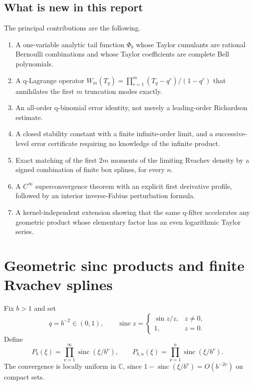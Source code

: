 \documentclass[11pt]{article}
\theoremstyle{definition}
\theoremstyle{remark}
\newcommand{\sinc}{\operatorname{sinc}}
\newcommand{\C}{\mathbb{C}}
\begin{document}
\subsection{What is new in this report}

The principal contributions are the following.

\begin{enumerate}[label=\textbf{N\arabic*.},leftmargin=12mm]
\item A one-variable analytic tail function \(\Phi_b\) whose Taylor cumulants
are rational Bernoulli combinations and whose Taylor coefficients are complete
Bell polynomials.

\item A q-Lagrange operator
\(W_m(T_q)=\prod_{r=1}^m(T_q-q^r)/(1-q^r)\) that annihilates the first \(m\)
truncation modes exactly.

\item An all-order q-binomial error identity, not merely a leading-order
Richardson estimate.

\item A closed stability constant with a finite infinite-order limit, and a
successive-level error certificate requiring no knowledge of the infinite
product.

\item Exact matching of the first \(2m\) moments of the limiting Rvachev density
by a signed combination of finite box splines, for every \(n\).

\item A \(C^\infty\) superconvergence theorem with an explicit first derivative
profile, followed by an interior inverse-Fabius perturbation formula.

\item A kernel-independent extension showing that the same q-filter accelerates
any geometric product whose elementary factor has an even logarithmic Taylor
series.
\end{enumerate}

\section{Geometric sinc products and finite Rvachev splines}
\label{sec:setup}

Fix \(b>1\) and set
\[
 q=b^{-2}\in(0,1),\qquad \sinc z=\begin{cases}\sin z/z,&z\ne0,\\1,&z=0.\end{cases}
\]
Define
\begin{equation}
 P_b(\xi)=\prod_{\nu=1}^{\infty}\sinc(\xi/b^\nu),
 \qquad
 P_{b,n}(\xi)=\prod_{\nu=1}^{n}\sinc(\xi/b^\nu).
 \label{eq:products}
\end{equation}
The convergence is locally uniform in \(\C\), since
\(1-\sinc(\xi/b^\nu)=O(b^{-2\nu})\) on compact sets.
\end{document}
